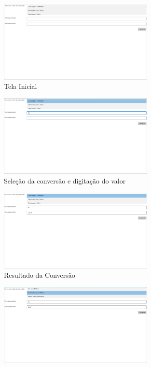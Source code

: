 \documentclass[
	12pt,				%
	oneside,			%
	a4paper,			%
	english,			%
	brazil,				%
	]{abntex2}
\begin{document}
{\begin{figure}[H]
    \centering
    \includegraphics[width=0.7\textwidth]{imgs/img1.png}
    \caption{Tela Inicial}
    \label{fig:img1}
\end{figure}
\begin{figure}[H]
    \centering
    \includegraphics[width=0.7\textwidth]{imgs/img2.png}
    \caption{Seleção da conversão e digitação do valor}
    \label{fig:img2}
\end{figure}
\begin{figure}[H]
    \centering
    \includegraphics[width=0.7\textwidth]{imgs/img3.png}
    \caption{Resultado da Conversão}
    \label{fig:img3}
\end{figure}
\begin{figure}[H]
    \centering
    \includegraphics[width=0.7\textwidth]{imgs/img4.png}

\end{figure}}
\end{document}

